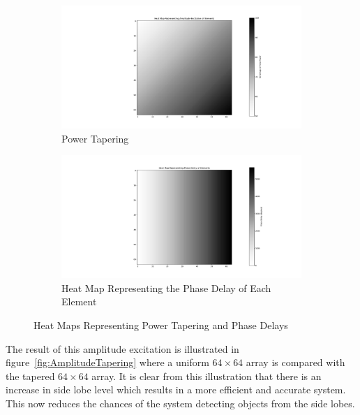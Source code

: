 \documentclass[11pt]{witseiepaper}
\begin{document}
\begin{figure}[htb]
    \centering
    \begin{subfigure}{.5\textwidth}
        \centering
            \includegraphics[width=0.9\linewidth]{PowerTapering.pdf}
            \caption{Power Tapering}
            \label{fig:PowerTapering}
        \end{subfigure}%
        \begin{subfigure}{.5\textwidth}
            \centering
            \includegraphics[width=0.9\linewidth]{PhasingHeatMap.pdf}
            \caption{Heat Map Representing the Phase Delay of Each Element}
                \label{fig:PhasingHeatMap}
            \end{subfigure}
\caption{Heat Maps Representing Power Tapering and Phase Delays}
\label{fig:HeatMaps}
\end{figure}

The result of this amplitude excitation is illustrated in figure~\ref{fig:AmplitudeTapering} where a uniform $64 \times 64$ array is compared with the tapered $64 \times 64$ array. It is clear from this illustration that there is an increase in side lobe level which results in a more efficient and accurate system. This now reduces the chances of the system detecting objects from the side lobes. 
\end{document}
